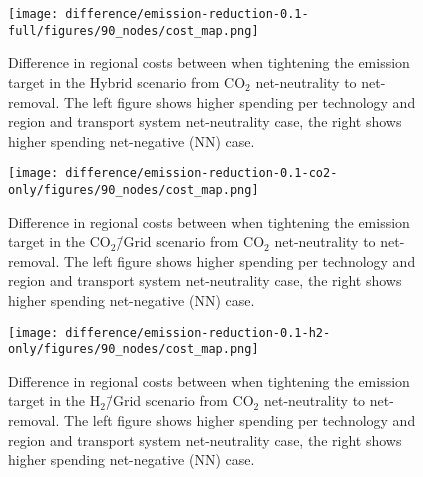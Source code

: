 \documentclass[twocolumn]{article}
\newcommand{\carbon}{CO$_2$}
\newcommand{\hydrogengrid}{H$_2$\=/Grid}
\newcommand{\carbonscenario}{CO$_2$\=/Grid scenario}
\newcommand{\hydrogenscenario}{H$_2$\=/Grid scenario}
\newcommand{\hybridscenario}{Hybrid scenario}
\begin{document}
\begin{figure}[ht!]
    \centering
    \texttt{[image: difference/emission-reduction-0.1-full/figures/90\_nodes/cost\_map.png]}
    \caption{Difference in regional costs between when tightening the emission target in the \hybridscenario{} from \carbon{} net-neutrality to net-removal. The left figure shows higher spending per technology and region and transport system net-neutrality case, the right shows higher spending net-negative (NN) case.}
    \label{fig:cost_map_difference_full_nn}
\end{figure}


\begin{figure}[ht!]
    \centering
    \texttt{[image: difference/emission-reduction-0.1-co2-only/figures/90\_nodes/cost\_map.png]}
    \caption{Difference in regional costs between when tightening the emission target in the \carbonscenario{} from \carbon{} net-neutrality to net-removal. The left figure shows higher spending per technology and region and transport system net-neutrality case, the right shows higher spending net-negative (NN) case.}
    \label{fig:cost_map_difference_co2_nn}
\end{figure}

\begin{figure}[ht!]
    \centering
    \texttt{[image: difference/emission-reduction-0.1-h2-only/figures/90\_nodes/cost\_map.png]}
    \caption{Difference in regional costs between when tightening the emission target in the \hydrogenscenario{} from \carbon{} net-neutrality to net-removal. The left figure shows higher spending per technology and region and transport system net-neutrality case, the right shows higher spending net-negative (NN) case.}
    \label{fig:cost_map_difference_h2_nn}
\end{figure}



\end{document}
